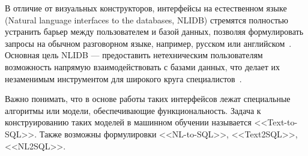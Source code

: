 В отличие от визуальных конструкторов, интерфейсы на естественном языке
(Natural language interfaces to the databases, NLIDB) стремятся полностью устранить
барьер между пользователем и базой данных, позволяя формулировать запросы на обычном разговорном языке,
например, русском или английском~\cite{anisyahNaturalLanguageInterface2019,
	bolyabkinIntellektualnayaSistemaDlya2021, borodinZadacheSostavleniyaZaprosov2016}.
Основная цель NLIDB --- предоставить нетехническим пользователям
возможность напрямую взаимодействовать с базами данных,
что делает их незаменимым инструментом для широкого круга
специалистов~\cite{desaiNaturalLanguageInterface2023, kumarEnhancingRelationalDatabase2024}.

Важно понимать, что в основе работы таких интерфейсов лежат специальные алгоритмы или модели,
обеспечивающие функциональность. Задача к конструированию таких моделей в машинном обучении
называется <<Text-to-SQL>>. Также возможны формулировки <<NL-to-SQL>>, <<Text2SQL>>, <<NL2SQL>>.

